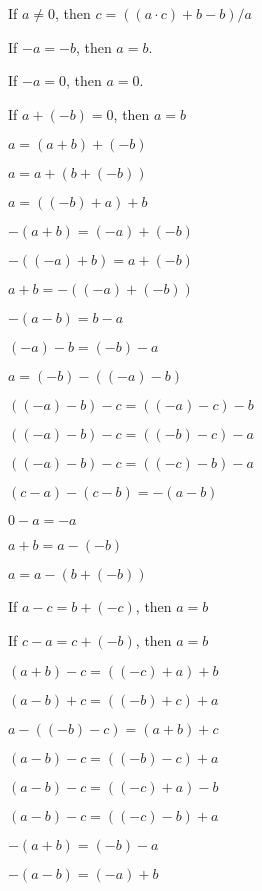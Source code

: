 \documentclass{article}
\begin{document}
\begin{thm}
  \bigbreak
\item\label{xcmplx1:132} If $a\neq0$, then
  $c=((a\cdot c) + b - b)/a$
  \bigbreak
\item\label{xcmplx1:133} If $-a=-b$, then $a=b$.
\item\label{xcmplx1:134} If $-a=0$, then $a=0$.
\item\label{xcmplx1:135} If $a+(-b)=0$, then $a=b$
\item\label{xcmplx1:136} $a=(a+b)+(-b)$
\item\label{xcmplx1:137} $a=a+(b + (-b))$
\item\label{xcmplx1:138} $a=((-b)+a)+b$
\item\label{xcmplx1:139} $-(a+b)=(-a)+(-b)$
\item\label{xcmplx1:140} $-((-a)+b)=a+(-b)$
\item\label{xcmplx1:141} $a+b=-((-a)+(-b))$
  \bigbreak
\item\label{xcmplx1:142} $-(a-b)=b-a$
\item\label{xcmplx1:143} $(-a)-b=(-b)-a$
\item\label{xcmplx1:144} $a=(-b)-((-a)-b)$
  \bigbreak
\item\label{xcmplx1:145} $((-a)-b)-c=((-a)-c)-b$
\item\label{xcmplx1:146} $((-a)-b)-c=((-b)-c)-a$
\item\label{xcmplx1:147} $((-a)-b)-c=((-c)-b)-a$
\item\label{xcmplx1:148} $(c-a)-(c-b)=-(a-b)$
  \bigbreak
\item\label{xcmplx1:149} $0-a=-a$
  \bigbreak
\item\label{xcmplx1:150} $a+b=a-(-b)$
\item\label{xcmplx1:151} $a=a-(b+(-b))$
\item\label{xcmplx1:152} If $a-c=b+(-c)$, then $a=b$
\item\label{xcmplx1:153} If $c-a=c+(-b)$, then $a=b$
  \bigbreak
\item\label{xcmplx1:154} $(a+b)-c=((-c)+a)+b$
\item\label{xcmplx1:155} $(a-b)+c=((-b)+c)+a$
\item\label{xcmplx1:156} $a-((-b)-c)=(a+b)+c$
  \bigbreak
\item\label{xcmplx1:157} $(a-b)-c=((-b)-c)+a$
\item\label{xcmplx1:158} $(a-b)-c=((-c)+a)-b$
\item\label{xcmplx1:159} $(a-b)-c=((-c)-b)+a$
  \bigbreak
\item\label{xcmplx1:160} $-(a+b)=(-b)-a$
\item\label{xcmplx1:161} $-(a-b)=(-a)+b$

\end{thm}
\end{document}
